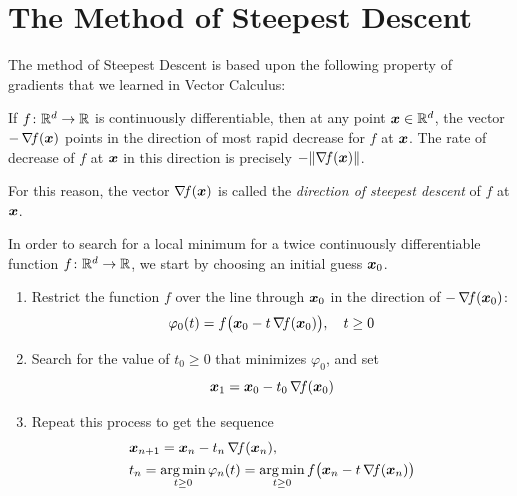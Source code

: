 
\section{The Method of Steepest Descent}

The method of Steepest Descent is based upon the following property of gradients that we learned in Vector Calculus:

\begin{theorem}
If $f \colon \mathbb{R}^d \to \mathbb{R}$ is continuously differentiable, then at any point $\boldsymbol{x} \in \mathbb{R}^d$, the vector $-\mathop{\nabla\! {f}}(\boldsymbol{x})$ points in the direction of most rapid decrease for $f$ at $\boldsymbol{x}$.  The rate of decrease of $f$ at $\boldsymbol{x}$ in this direction is precisely $-\lVert \mathop{\nabla\! {f}}(\boldsymbol{x}) \rVert$.
\end{theorem}

\begin{remark}
For this reason, the vector $\mathop{\nabla\! {f}}(\boldsymbol{x})$ is called the \emph{direction of steepest descent} of $f$ at $\boldsymbol{x}$.
\end{remark}

In order to search for a local minimum for a twice continuously differentiable function $f\colon \mathbb{R}^d \to \mathbb{R}$, we start by choosing an initial guess $\boldsymbol{x}_0$.  
\begin{enumerate}
	\item Restrict the function $f$ over the line through $\boldsymbol{x}_0$ in the direction of $-\mathop{\nabla\! {f}}(\boldsymbol{x}_0)$:
	\begin{equation*}
	\varphi_0(t) = f\big( \boldsymbol{x}_0 - t \mathop{\nabla\! {f}}(\boldsymbol{x}_0) \big), \quad t\geq 0
	\end{equation*}
	\item Search for the value of $t_0 \geq 0$ that minimizes $\varphi_0$, and set 
	\begin{equation*}
	\boldsymbol{x}_1 = \boldsymbol{x}_0 - t_0\mathop{\nabla\! {f}}(\boldsymbol{x}_0)
	\end{equation*}
	\item Repeat this process to get the sequence
	\begin{gather}\label{equation:SteepestDescent}
	\begin{split}
	&\boldsymbol{x}_{n+1} = \boldsymbol{x}_n - t_n \mathop{\nabla\! {f}}(\boldsymbol{x}_n), \\ &t_n = \operatorname*{arg\,min}_{t\geq 0} \varphi_n(t) = \operatorname*{arg\,min}_{t\geq 0} f\big(\boldsymbol{x}_n - t\mathop{\nabla\! {f}}(\boldsymbol{x}_n)\big)
	\end{split}
	\end{gather}
\end{enumerate}

